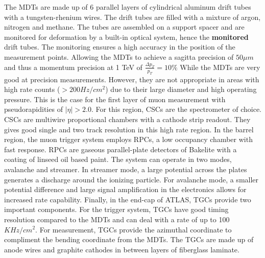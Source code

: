\indent The MDTs are made up of 6 parallel layers of cylindrical aluminum drift tubes with a tungsten-rhenium wires. The drift tubes are filled with a mixture of argon, nitrogen and methane. The tubes are assembled on a support spacer and are monitored for deformation by a built-in optical system, hence the \textbf{monitored} drift tubes. The monitoring ensures a high accuracy in the position of the measurement points. Allowing the MDTs to achieve a sagitta precision of ${50\mu{m}}$ and thus a momentum precision at 1 TeV of ${\frac{\Delta{p_{T}}}{p_{T}}=10\%}$ \linebreak
\indent While the MDTs are very good at precision measurements. However, they are not appropriate in areas with high rate counts (${> 200 Hz/cm^{2}}$) due to their large diameter and high operating pressure. This is the case for the first layer of muon measurement with pseudorapidities of ${|\eta{}|>2.0}$. For this region, CSCs are the spectrometer of choice. CSCs are multiwire proportional chambers with a cathode strip readout. They gives good single and two track resolution in this high rate region.\linebreak
\indent In the barrel region, the muon trigger system employs RPCs, a low occupancy chamber with fast response. RPCs are gaseous parallel-plate detectors of Bakelite with a coating of linseed oil based paint. The system can operate in two modes, avalanche and streamer.  In streamer mode, a large potential across the plates generates a discharge around the ionizing particle. For avalanche mode, a smaller potential difference and large signal amplification in the electronics allows for increased rate capability.\linebreak
\indent Finally, in the end-cap of ATLAS, TGCs provide two important components. For the trigger system, TGCs have good timing resolution compared to the MDTs and can deal with a rate of up to 100 ${KHz/cm^{2}}$. For measurement, TGCs provide the azimuthal coordinate to compliment the bending coordinate from the MDTs. The TGCs are made up of anode wires and graphite cathodes in between layers of fiberglass laminate. 

